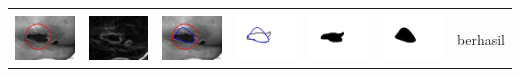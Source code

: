 \begin{table}[H]
\begin{tabular}{|m{0.7in}|m{0.7in}|m{0.7in}|m{0.7in}|m{0.7in}|m{0.7in}|m{0.7in}|}
		&  &  & & & &  \\
		\includegraphics[width=0.7in]{dataset/dataset_3/luka_hitam/ready/40_interp_init.jpg}&
		\includegraphics[width=0.7in]{dataset/dataset_3/luka_hitam/ready/40_interp_ext.jpg}&
		\includegraphics[width=0.7in]{dataset/dataset_3/luka_hitam/ready/40_interp_result.jpg}&
		\includegraphics[width=0.7in]{dataset/dataset_3/luka_hitam/ready/40_gt_r.jpg}&
		\includegraphics[width=0.7in]{dataset/dataset_3/luka_hitam/ready/40_r.jpg}&
		\includegraphics[width=0.7in]{dataset/dataset_3/luka_hitam/ready/40_interp_r.jpg}&
		berhasil\\
		\hline
		

\end{tabular}
\end{table}
